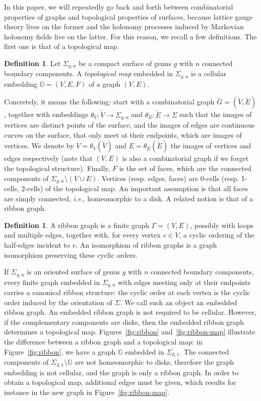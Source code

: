 \documentclass[11pt,a4paper,reqno]{article}
\theoremstyle{definition}
\newtheorem{definition}[theorem]{Definition}
\theoremstyle{remark}
\newcommand\Gbb{{\mathbb{G}}}
\begin{document}
In this paper, we will repeatedly go back and forth between combinatorial properties of graphs and topological properties of surfaces, because lattice gauge theory lives on the former and the holonomy processes induced by Markovian holonomy fields live on the latter. For this reason, we recall a few definitions. The first one is that of a topological map.

\begin{definition}\label{def:topological_map}
Let $\Sigma_{g,n}$ be a compact surface of genus $g$ with $n$ connected boundary components. A \emph{topological map} embedded in $\Sigma_{g,n}$ is a cellular embedding $\Gbb=(V,E,F)$ of a graph $(V,E)$. 
\end{definition}

Concretely, it means the following: start with a combinatorial graph $\tilde{G}=(\tilde{V},\tilde{E})$, together with embeddings $\theta_V:\tilde{V}\to\Sigma_{g,n}$ and $\theta_E:\tilde{E}\to\Sigma$ such that the images of vertices are distinct points of the surface, and the images of edges are continuous curves on the surface, that only meet at their endpoints, which are images of vertices. We denote by $V=\theta_V(\tilde{V})$ and $E=\theta_E(\tilde{E})$ the images of vertices and edges respectively (note that $(V,E)$ is also a combinatorial graph if we forget the topological structure). Finally, $F$ is the set of faces, which are the connected components of $\Sigma_{g,n}\setminus(V\cup E)$. Vertices (resp. edges, faces) are 0-cells (resp. 1-cells, 2-cells) of the topological map. An important assumption is that all faces are simply connected, \emph{i.e.}, homeomorphic to a disk. A related notion is that of a ribbon graph.

\begin{definition}A ribbon graph is a finite graph $\Gamma=(V,E)$, possibly with loops and multiple edges, together with, for every vertex $v\in V$, a cyclic ordering of the half-edges incident to $v$. An isomorphism of ribbon graphs is a graph isomorphism preserving these cyclic orders.
\end{definition}

If $\Sigma_{g,n}$ is an oriented surface of genus $g$ with $n$ connected boundary components, every finite graph embedded in $\Sigma_{g,n}$ with edges meeting only at their endpoints carries a canonical ribbon structure: the cyclic order at each vertex is the cyclic order induced by the orientation of $\Sigma$. We call such an object an embedded ribbon graph. An embedded ribbon graph is not required to be cellular. However, if the complementary components are disks, then the embedded ribbon graph determines a topological map. Figures~\ref{fig:ribbon} and~\ref{fig:ribbon-map} illustrate the difference between a ribbon graph and a topological map: in Figure~\ref{fig:ribbon}, we have a graph $\Gbb$ embedded in $\Sigma_{3,1}$. The connected components of $\Sigma_{3,1}\setminus\Gbb$ are not homeomorphic to disks, therefore the graph embedding is not cellular, and the graph is only a ribbon graph. In order to obtain a topological map, additional edges must be given, which results for instance in the new graph in Figure~\ref{fig:ribbon-map}.
\end{document}
